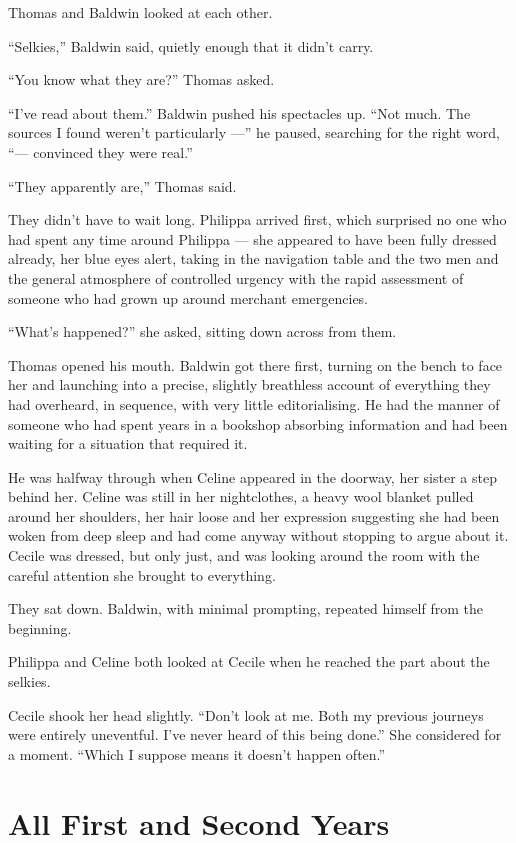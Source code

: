 Thomas and Baldwin looked at each other.

\enquote{Selkies,} Baldwin said, quietly enough that it didn't carry.

\enquote{You know what they are?} Thomas asked.

\enquote{I've read about them.} Baldwin pushed his spectacles up. \enquote{Not much. The sources I found weren't particularly ---} he paused, searching for the right word, \enquote{--- convinced they were real.}

\enquote{They apparently are,} Thomas said.

They didn't have to wait long. Philippa arrived first, which surprised no one who had spent any time around Philippa --- she appeared to have been fully dressed already, her blue eyes alert, taking in the navigation table and the two men and the general atmosphere of controlled urgency with the rapid assessment of someone who had grown up around merchant emergencies.

\enquote{What's happened?} she asked, sitting down across from them.

Thomas opened his mouth. Baldwin got there first, turning on the bench to face her and launching into a precise, slightly breathless account of everything they had overheard, in sequence, with very little editorialising. He had the manner of someone who had spent years in a bookshop absorbing information and had been waiting for a situation that required it.

He was halfway through when Celine appeared in the doorway, her sister a step behind her. Celine was still in her nightclothes, a heavy wool blanket pulled around her shoulders, her hair loose and her expression suggesting she had been woken from deep sleep and had come anyway without stopping to argue about it. Cecile was dressed, but only just, and was looking around the room with the careful attention she brought to everything.

They sat down. Baldwin, with minimal prompting, repeated himself from the beginning.

Philippa and Celine both looked at Cecile when he reached the part about the selkies.

Cecile shook her head slightly. \enquote{Don't look at me. Both my previous journeys were entirely uneventful. I've never heard of this being done.} She considered for a moment. \enquote{Which I suppose means it doesn't happen often.}

\section*{All First and Second Years}


